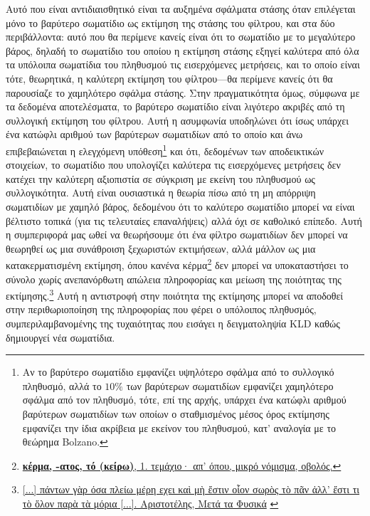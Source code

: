 Αυτό που είναι αντιδιαισθητικό είναι τα αυξημένα σφάλματα στάσης όταν
επιλέγεται μόνο το βαρύτερο σωματίδιο ως εκτίμηση της στάσης του φίλτρου, και
στα δύο περιβάλλοντα: αυτό που θα περίμενε κανείς είναι ότι το σωματίδιο με το
μεγαλύτερο βάρος, δηλαδή το σωματίδιο του οποίου η εκτίμηση στάσης εξηγεί
καλύτερα από όλα τα υπόλοιπα σωματίδια του πληθυσμού τις εισερχόμενες
μετρήσεις, και το οποίο είναι τότε, θεωρητικά, η καλύτερη εκτίμηση του
φίλτρου---θα περίμενε κανείς ότι θα παρουσίαζε το χαμηλότερο σφάλμα στάσης.
Στην πραγματικότητα όμως, σύμφωνα με τα δεδομένα αποτελέσματα, το βαρύτερο
σωματίδιο είναι λιγότερο ακριβές από τη συλλογική εκτίμηση του φίλτρου. Αυτή η
ασυμφωνία υποδηλώνει ότι ίσως υπάρχει ένα κατώφλι αριθμού των βαρύτερων
σωματιδίων από το οποίο και άνω επιβεβαιώνεται η ελεγχόμενη υπόθεση\footnote{Αν
το βαρύτερο σωματίδιο εμφανίζει υψηλότερο σφάλμα από το συλλογικό πληθυσμό,
αλλά το $10\%$ των βαρύτερων σωματιδίων εμφανίζει χαμηλότερο σφάλμα από τον
πληθυσμό, τότε, επί της αρχής, υπάρχει ένα κατώφλι αριθμού βαρύτερων σωματιδίων
των οποίων ο σταθμισμένος μέσος όρος εκτίμησης εμφανίζει την ίδια ακρίβεια με
εκείνον του πληθυσμού, κατ' αναλογία με το θεώρημα Bolzano.} και ότι, δεδομένων
των αποδεικτικών στοιχείων, το σωματίδιο που υπολογίζει καλύτερα τις
εισερχόμενες μετρήσεις δεν κατέχει την καλύτερη αξιοπιστία σε σύγκριση με
εκείνη του πληθυσμού ως συλλογικότητα. Αυτή είναι ουσιαστικά η θεωρία πίσω από
τη μη απόρριψη σωματιδίων με χαμηλό βάρος, δεδομένου ότι το καλύτερο σωματίδιο
μπορεί να είναι βέλτιστο τοπικά (για τις τελευταίες επαναλήψεις) αλλά όχι σε
καθολικό επίπεδο. Αυτή η συμπεριφορά μας ωθεί να θεωρήσουμε ότι ένα φίλτρο
σωματιδίων δεν μπορεί να θεωρηθεί ως μια συνάθροιση ξεχωριστών εκτιμήσεων, αλλά
μάλλον ως μια κατακερματισμένη εκτίμηση, όπου κανένα
κέρμα\footnote{\href{https://www.greek-language.gr/digitalResources/ancient_greek/tools/liddell-scott/search.html?lq=\%CE\%BA\%CE\%AD\%CF\%81\%CE\%BC\%CE\%B1}
{\textbf{κέρμα, -ατος, τό (κείρω)}, 1.  τεμάχιο· απ' όπου, μικρό νόμισμα,
οβολός.}} δεν μπορεί να υποκαταστήσει το σύνολο χωρίς ανεπανόρθωτη απώλεια
πληροφορίας και μείωση της ποιότητας της
εκτίμησης.\footnote{\href{https://bit.ly/3Hw9T12}{[...] πάντων γὰρ όσα πλείω
μέρη εχει καὶ μὴ ἔστιν οἷον σωρὸς τὸ πᾶν ἀλλ' ἔστι τι τὸ ὅλον παρὰ τὰ μόρια
[...]. Αριστοτέλης, Μετά τα Φυσικά} \label{quote:aristotle}} Αυτή η αντιστροφή
στην ποιότητα της εκτίμησης μπορεί να αποδοθεί στην περιθωριοποίηση της
πληροφορίας που φέρει ο υπόλοιπος πληθυσμός, συμπεριλαμβανομένης της
τυχαιότητας που εισάγει η δειγματοληψία KLD καθώς δημιουργεί νέα σωματίδια.

